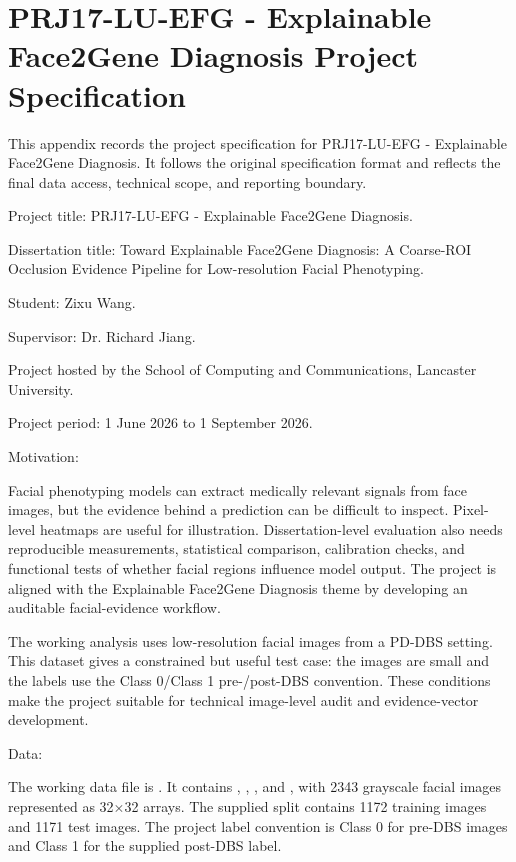 
\chapter{PRJ17-LU-EFG - Explainable Face2Gene Diagnosis Project Specification}

This appendix records the project specification for PRJ17-LU-EFG - Explainable Face2Gene Diagnosis. It follows the original specification format and reflects the final data access, technical scope, and reporting boundary.


Project title: PRJ17-LU-EFG - Explainable Face2Gene Diagnosis.


Dissertation title: Toward Explainable Face2Gene Diagnosis: A Coarse-ROI Occlusion Evidence Pipeline for Low-resolution Facial Phenotyping.


Student: Zixu Wang.


Supervisor: Dr. Richard Jiang.


Project hosted by the School of Computing and Communications, Lancaster University.


Project period: 1 June 2026 to 1 September 2026.


Motivation:


Facial phenotyping models can extract medically relevant signals from face images, but the evidence behind a prediction can be difficult to inspect. Pixel-level heatmaps are useful for illustration. Dissertation-level evaluation also needs reproducible measurements, statistical comparison, calibration checks, and functional tests of whether facial regions influence model output. The project is aligned with the Explainable Face2Gene Diagnosis theme by developing an auditable facial-evidence workflow.


The working analysis uses low-resolution facial images from a PD-DBS setting. This dataset gives a constrained but useful test case: the images are small and the labels use the Class 0/Class 1 pre-/post-DBS convention. These conditions make the project suitable for technical image-level audit and evidence-vector development.


Data:


The working data file is . It contains \texttt{}, \texttt{}, \texttt{}, and \texttt{}, with 2343 grayscale facial images represented as 32$\times$32 arrays. The supplied split contains 1172 training images and 1171 test images. The project label convention is Class 0 for pre-DBS images and Class 1 for the supplied post-DBS label.


